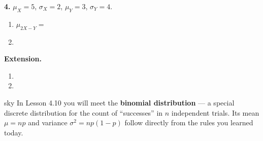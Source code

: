 \documentclass[10pt]{article}
\begin{document}
\begin{practicebox}
\vspace{0.14in}

\textbf{4.} $\mu_X=5$, $\sigma_X=2$, $\mu_Y=3$, $\sigma_Y=4$.

\begin{enumerate}[label=(\alph*), leftmargin=2em, itemsep=8pt]
  \item $\mu_{2X-Y} = $ 
  \item {}
\end{enumerate}

\end{practicebox}

\vspace{0.1in}

\begin{extensionbox}
\small
\textbf{Extension.}
\begin{enumerate}[leftmargin=1.5em, itemsep=6pt]
  \item {}

  \item {}
\end{enumerate}
\end{extensionbox}

\vspace{0.1in}

\begin{blurbbox}{sky}
\small
In Lesson 4.10 you will meet the \textbf{binomial distribution} --- a special discrete
distribution for the count of ``successes'' in $n$ independent trials. Its mean $\mu = np$
and variance $\sigma^2 = np(1-p)$ follow directly from the rules you learned today.
\end{blurbbox}
\end{document}
